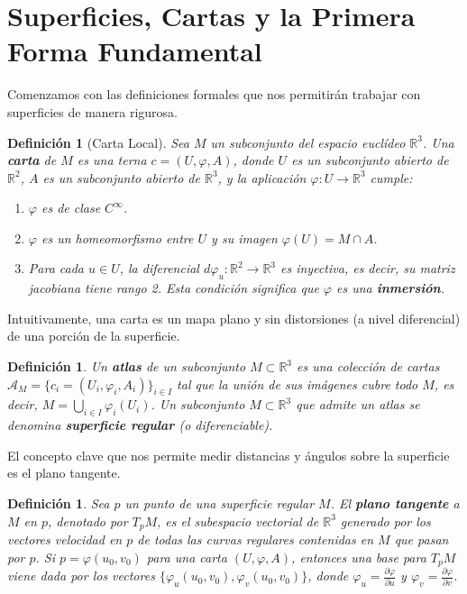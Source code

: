 \documentclass[12pt, a4paper]{report}
\theoremstyle{miestilo}
\theoremstyle{midefinicion}
\newtheorem{definicion}[teorema]{Definición}
\begin{document}
\section{Superficies, Cartas y la Primera Forma Fundamental}

Comenzamos con las definiciones formales que nos permitirán trabajar con superficies de manera rigurosa.

\begin{definicion}[Carta Local]
Sea $M$ un subconjunto del espacio euclídeo $\mathbb{R}^3$. Una \textbf{carta} de $M$ es una terna $c = (U, \varphi, A)$, donde $U$ es un subconjunto abierto de $\mathbb{R}^2$, $A$ es un subconjunto abierto de $\mathbb{R}^3$, y la aplicación $\varphi: U \to \mathbb{R}^3$ cumple:
\begin{enumerate}
    \item $\varphi$ es de clase $C^\infty$.
    \item $\varphi$ es un homeomorfismo entre $U$ y su imagen $\varphi(U) = M \cap A$.
    \item Para cada $u \in U$, la diferencial $d\varphi_u: \mathbb{R}^2 \to \mathbb{R}^3$ es inyectiva, es decir, su matriz jacobiana tiene rango 2. Esta condición significa que $\varphi$ es una \textbf{inmersión}.
\end{enumerate}
\end{definicion}

Intuitivamente, una carta es un mapa plano y sin distorsiones (a nivel diferencial) de una porción de la superficie.

\begin{definicion}
Un \textbf{atlas} de un subconjunto $M \subset \mathbb{R}^3$ es una colección de cartas $\mathcal{A}_M = \{c_i = (U_i, \varphi_i, A_i)\}_{i \in I}$ tal que la unión de sus imágenes cubre todo $M$, es decir, $M = \bigcup_{i \in I} \varphi_i(U_i)$. Un subconjunto $M \subset \mathbb{R}^3$ que admite un atlas se denomina \textbf{superficie regular} (o diferenciable).
\end{definicion}

El concepto clave que nos permite medir distancias y ángulos sobre la superficie es el plano tangente.

\begin{definicion}
Sea $p$ un punto de una superficie regular $M$. El \textbf{plano tangente} a $M$ en $p$, denotado por $T_pM$, es el subespacio vectorial de $\mathbb{R}^3$ generado por los vectores velocidad en $p$ de todas las curvas regulares contenidas en $M$ que pasan por $p$. Si $p = \varphi(u_0, v_0)$ para una carta $(U, \varphi, A)$, entonces una base para $T_pM$ viene dada por los vectores $\{\varphi_u(u_0, v_0), \varphi_v(u_0, v_0)\}$, donde $\varphi_u = \frac{\partial\varphi}{\partial u}$ y $\varphi_v = \frac{\partial\varphi}{\partial v}$.
\end{definicion}
\end{document}
